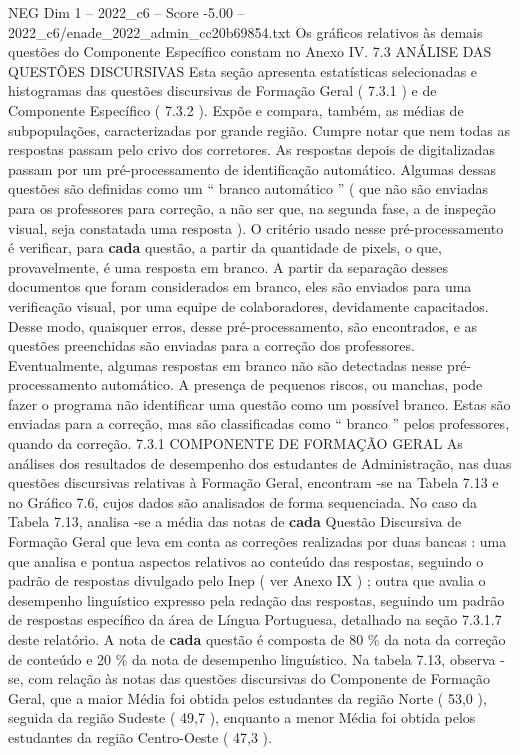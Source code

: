 \begin{textsample}{NEG Dim 1 – 2022\_c6 – Score -5.00 – 2022\_c6/enade\_2022\_admin\_cc20b69854.txt}
Os gráficos relativos às demais questões do Componente Específico constam no Anexo IV. 7.3 ANÁLISE DAS QUESTÕES DISCURSIVAS Esta seção apresenta estatísticas selecionadas e histogramas das questões discursivas de Formação Geral ( 7.3.1 ) e de Componente Específico ( 7.3.2 ).
Expõe e compara, também, as médias de subpopulações, caracterizadas por grande região.
Cumpre notar que nem todas as respostas passam pelo crivo dos corretores.
As respostas depois de digitalizadas passam por um pré-processamento de identificação automático.
Algumas dessas questões são definidas como um “ branco automático ” ( que não são enviadas para os professores para correção, a não ser que, na segunda fase, a de inspeção visual, seja constatada uma resposta ).
O critério usado nesse pré-processamento é verificar, para \textbf{cada} questão, a partir da quantidade de pixels, o que, provavelmente, é uma resposta em branco.
A partir da separação desses documentos que foram considerados em branco, eles são enviados para uma verificação visual, por uma equipe de colaboradores, devidamente capacitados.
Desse modo, quaisquer erros, desse pré-processamento, são encontrados, e as questões preenchidas são enviadas para a correção dos professores.
Eventualmente, algumas respostas em branco não são detectadas nesse pré-processamento automático.
A presença de pequenos riscos, ou manchas, pode fazer o programa não identificar uma questão como um possível branco.
Estas são enviadas para a correção, mas são classificadas como “ branco ” pelos professores, quando da correção. 7.3.1 COMPONENTE DE FORMAÇÃO GERAL As análises dos resultados de desempenho dos estudantes de Administração, nas duas questões discursivas relativas à Formação Geral, encontram -se na Tabela 7.13 e no Gráfico 7.6, cujos dados são analisados de forma sequenciada.
No caso da Tabela 7.13, analisa -se a média das notas de \textbf{cada} Questão Discursiva de Formação Geral que leva em conta as correções realizadas por duas bancas : uma que analisa e pontua aspectos relativos ao conteúdo das respostas, seguindo o padrão de respostas divulgado pelo Inep ( ver Anexo IX ) ; outra que avalia o desempenho linguístico expresso pela redação das respostas, seguindo um padrão de respostas específico da área de Língua Portuguesa, detalhado na seção 7.3.1.7 deste relatório.
A nota de \textbf{cada} questão é composta de 80 \% da nota da correção de conteúdo e 20 \% da nota de desempenho linguístico.
Na tabela 7.13, observa -se, com relação às notas das questões discursivas do Componente de Formação Geral, que a maior Média foi obtida pelos estudantes da região Norte ( 53,0 ), seguida da região Sudeste ( 49,7 ), enquanto a menor Média foi obtida pelos estudantes da região Centro-Oeste ( 47,3 ).

\end{textsample}
